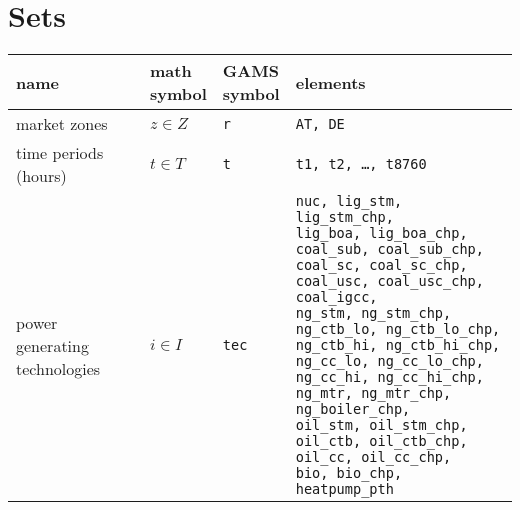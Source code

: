 \documentclass[11pt,a4paper]{article}
\begin{document}

\section{Sets} \label{sets}
\begin{tabular}{l l l l}
\textbf{name} & \makecell[l]{\textbf{math} \\ \textbf{symbol}} & \makecell[l]{\textbf{GAMS} \\\textbf{symbol}} & \textbf{elements} \\
\hline \hline
market zones & $z \in Z$ & \texttt{r} & \texttt{AT, DE} \\ \hline

\makecell[l]{time periods \\(hours)} & $t \in T$ & \texttt{t} & \texttt{t1, t2, \ldots, t8760} \\ \hline

\makecell[l]{power generating \\technologies} & $i \in I$ & \texttt{tec} & 

\makecell[l]{ \texttt{nuc, lig\_stm, lig\_stm\_chp,}\\
	\texttt{lig\_boa, lig\_boa\_chp,} \\
	\texttt{coal\_sub, coal\_sub\_chp,} \\
	\texttt{coal\_sc, coal\_sc\_chp,}\\
	\texttt{coal\_usc, coal\_usc\_chp,} \\
	\texttt{coal\_igcc,}\\
	\texttt{ng\_stm, ng\_stm\_chp,} \\
	\texttt{ng\_ctb\_lo, ng\_ctb\_lo\_chp,}\\ 
	\texttt{ng\_ctb\_hi, ng\_ctb\_hi\_chp,}\\
	\texttt{ng\_cc\_lo, ng\_cc\_lo\_chp,}\\
	\texttt{ng\_cc\_hi, ng\_cc\_hi\_chp,}\\
	\texttt{ng\_mtr, ng\_mtr\_chp,} \\
	\texttt{ng\_boiler\_chp,} \\
	\texttt{oil\_stm, oil\_stm\_chp,} \\ 
	\texttt{oil\_ctb, oil\_ctb\_chp,} \\
	\texttt{oil\_cc, oil\_cc\_chp,} \\
	\texttt{bio, bio\_chp,}
	\texttt{heatpump\_pth} 
} \\ \hline


\end{tabular}
\end{document}
